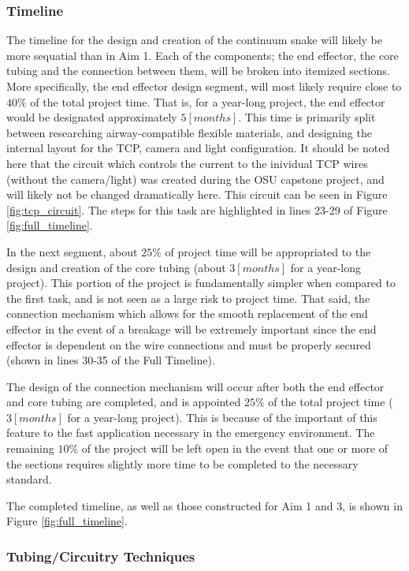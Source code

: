 	\subsubsection{Timeline}
	
		The timeline for the design and creation of the continuum snake will likely be more sequatial than in Aim 1. Each of the components; the end effector, the core tubing and the connection between them, will be broken into itemized sections. More specifically, the end effector design segment, will most likely require close to $40\%$ of the total project time. That is, for a year-long project, the end effector would be designated approximately $5[months]$. This time is primarily split between researching airway-compatible flexible materials, and designing the internal layout for the TCP, camera and light configuration. It should be noted here that the circuit which controls the current to the inividual TCP wires (without the camera/light) was created during the OSU capstone project, and will likely not be changed dramatically here. This circuit can be seen in Figure \ref{fig:tcp_circuit}. The steps for this task are highlighted in lines 23-29 of Figure \ref{fig:full_timeline}.
		
		In the next segment, about $25\%$ of project time will be appropriated to the design and creation of the core tubing (about $3[months]$ for a year-long project). This portion of the project is fundamentally simpler when compared to the first task, and is not seen as a large risk to project time. That said, the connection mechanism which allows for the smooth replacement of the end effector in the event of a breakage will be extremely important since the end effector is dependent on the wire connections and must be properly secured (shown in lines 30-35 of the Full Timeline).
		
		The design of the connection mechanism will occur after both the end effector and core tubing are completed, and is appointed $25\%$ of the total project time ($3[months]$ for a year-long project). This is because of the important of this feature to the fast application necessary in the emergency environment. The remaining $10\%$ of the project will be left open in the event that one or more of the sections requires slightly more time to be completed to the necessary standard.
		
		The completed timeline, as well as those constructed for Aim 1 and 3, is shown in Figure \ref{fig:full_timeline}.
	
	\subsubsection{Tubing/Circuitry Techniques}

